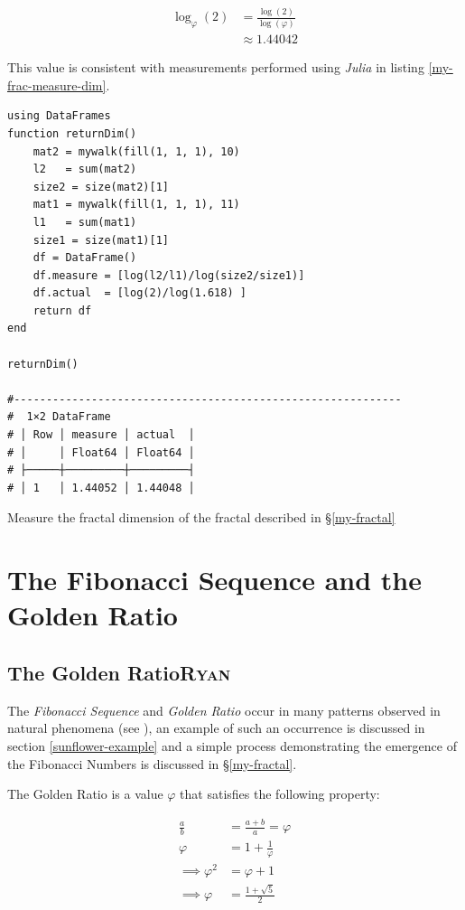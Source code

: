 \documentclass[a4paper,11pt,twoside]{article}
\begin{document}
\begin{align}
\log_{\varphi}\left(2\right) &= \frac{\log (2)}{\log (\varphi)} \\
&\approx 1.44042
\end{align}

This value is consistent with measurements performed using \emph{Julia} in listing \ref{my-frac-measure-dim}.

\begin{listing}[htbp]
\begin{verbatim}
using DataFrames
function returnDim()
    mat2 = mywalk(fill(1, 1, 1), 10)
    l2   = sum(mat2)
    size2 = size(mat2)[1]
    mat1 = mywalk(fill(1, 1, 1), 11)
    l1   = sum(mat1)
    size1 = size(mat1)[1]
    df = DataFrame()
    df.measure = [log(l2/l1)/log(size2/size1)]
    df.actual  = [log(2)/log(1.618) ]
    return df
end

returnDim()

#------------------------------------------------------------
#  1×2 DataFrame
# │ Row │ measure │ actual  │
# │     │ Float64 │ Float64 │
# ├─────┼─────────┼─────────┤
# │ 1   │ 1.44052 │ 1.44048 │
\end{verbatim}
\caption{\label{my-frac-measure-dim}Measure the fractal dimension of the fractal described in \S \ref{my-fractal}}
\end{listing}

\section{The Fibonacci Sequence and the Golden Ratio}
\label{fib-golden-ratio-proof}
\subsection{The Golden Ratio\hfill{}\textsc{Ryan}}
\label{sec:org1932b82}
The \emph{Fibonacci Sequence} and \emph{Golden Ratio} occur in many patterns observed
in natural phenomena (see
\cite{shellyallenFibonacciNature,benedettapalazzoNumbersNatureFibonacci2016,MinarovaNikoletta2014TFSN,NatureGoldenRatio2018,robertlambHowAreFibonacci2008,ronknottFibonacciNumbersGolden2016}),
an example of such an occurrence is discussed in section \ref{sunflower-example} and
a simple process demonstrating the emergence of the Fibonacci Numbers
is discussed in \S \ref{my-fractal}.

The Golden Ratio is a value \(\varphi\) that satisfies the following property:

\begin{align}
    \frac{a}{b} &=  \frac{a+  b}{a}= \varphi \nonumber \\
    \varphi &= 1+ \frac{1}{\varphi} \nonumber \\
    \implies  \varphi^2 &= \varphi +  1 \label{eq:phi-sim-to-fib-rec} \\
    \implies  \varphi &= \frac{1+ \sqrt{5} }{2} \label{eq:phi-value}
\end{align}
\end{document}

